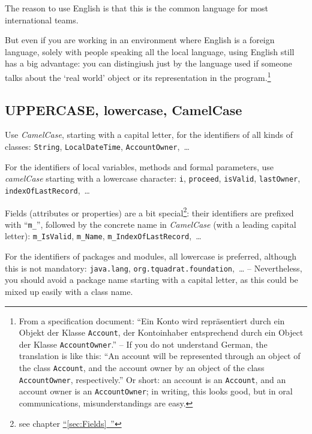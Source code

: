 \documentclass[11pt,a4paper, titlepage, parskip=half, headsepline, footsepline, cleardoublepage=current, headheight=1cm]{scrbook}
\newcommand*{\tqfullref}[1]{\hyperref[{#1}]{“\ref*{#1}~\nameref*{#1}”}}
\begin{document}
The reason to use English is that this is the common language for most international teams.

But even if you are working in an environment where English is a foreign language, solely with people speaking all the local language, using English still has a big advantage: you can distingiush just by the language used if someone talks about the ‘real world’ object or its representation in the program.\footnote{From a specification document: “Ein Konto wird repräsentiert durch ein Objekt der Klasse \lstinline|Account|, der Kontoinhaber entsprechend durch ein Object der Klasse \lstinline|AccountOwner|.” – If you do not understand German, the translation is like this: “An account will be represented through an object of the class \lstinline|Account|, and the account owner by an object of the class \lstinline|AccountOwner|, respectively.” Or short: an account is an \lstinline|Account|, and an account owner is an \lstinline|AccountOwner|; in writing, this looks good, but in oral communications, misunderstandings are easy.}


\subsection{UPPERCASE, lowercase, CamelCase}\label{sec:CaseOfNames}
Use \textit{CamelCase}, starting with a capital letter, for the identifiers of all kinds of classes: \lstinline|String|, \lstinline|LocalDateTime|, \lstinline|AccountOwner|,~…

For the identifiers of local variables, methods and formal parameters, use \textit{camelCase} starting with a lowercase character: \lstinline|i|, \lstinline|proceed|, \lstinline|isValid|, \lstinline|lastOwner|, \lstinline|indexOfLastRecord|,~…

Fields (attributes or properties) are a bit special\footnote{see chapter \tqfullref{sec:Fields}}: their identifiers are prefixed with “\verb#m_#”, followed by the concrete name in \textit{CamelCase} (with a leading capital letter): \lstinline|m_IsValid|, \lstinline|m_Name|, \lstinline|m_IndexOfLastRecord|,~…

For the identifiers of packages and modules, all lowercase is preferred, although this is not mandatory: \lstinline|java.lang|, \lstinline|org.tquadrat.foundation|,~… – Nevertheless, you should avoid a package name starting with a capital letter, as this could be mixed up easily with a class name.
\end{document}
